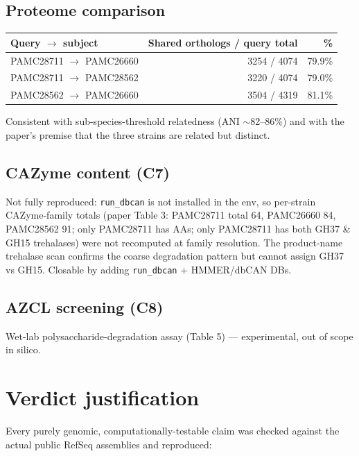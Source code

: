 \documentclass[11pt]{article}
\begin{document}
\subsection{Proteome comparison}

\begin{longtable}{@{}lrr@{}}
\toprule
Query $\to$ subject & Shared orthologs / query total & \% \\
\midrule
PAMC28711 $\to$ PAMC26660 & 3254 / 4074 & 79.9\% \\
PAMC28711 $\to$ PAMC28562 & 3220 / 4074 & 79.0\% \\
PAMC28562 $\to$ PAMC26660 & 3504 / 4319 & 81.1\% \\
\bottomrule
\end{longtable}

Consistent with sub-species-threshold relatedness (ANI $\sim$82--86\%) and with the paper's
premise that the three strains are related but distinct.

\subsection{CAZyme content (C7)}
Not fully reproduced: \texttt{run\_dbcan} is not installed in the env, so per-strain
CAZyme-family totals (paper Table 3: PAMC28711 total 64, PAMC26660 84, PAMC28562 91; only
PAMC28711 has AAs; only PAMC28711 has both GH37 \& GH15 trehalases) were not recomputed at
family resolution. The product-name trehalase scan confirms the coarse degradation pattern but
cannot assign GH37 vs GH15. Closable by adding \texttt{run\_dbcan} + HMMER/dbCAN DBs.

\subsection{AZCL screening (C8)}
Wet-lab polysaccharide-degradation assay (Table 5) --- experimental, out of scope in silico.

\section{Verdict justification}

Every purely genomic, computationally-testable claim was checked against the actual public
RefSeq assemblies and reproduced:
\end{document}
